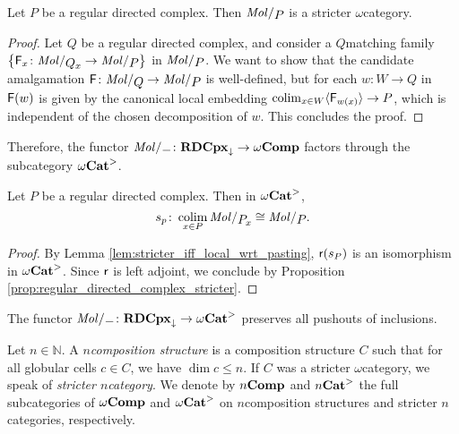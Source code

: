 \begin{prop} \label{prop:regular_directed_complex_stricter}
    Let \( P \) be a regular directed complex.
    Then \( \molecin{P} \) is a stricter \( \omega \)\nbd category.
\end{prop}
\begin{proof}
    Let \( Q \) be a regular directed complex, and consider a \( Q \)\nbd matching family \( \set{\F_x \colon \molecin{\imel{Q}{x}} \to \molecin{P}} \) in \( \molecin{P} \).
    We want to show that the candidate amalgamation \( \F \colon \molecin{Q} \to \molecin{P} \) is well-defined, but for each \( w \colon W \to Q \) in \( \mathsf{F}(w) \) is given by the canonical local embedding \( \operatorname*{colim}_{x \in W} \langle\mathsf{F}_{w(x)}\rangle \to P \), which is independent of the chosen decomposition of \( w \).
    This concludes the proof.
\end{proof}

\noindent Therefore, the functor \( \molecin{-} \colon \rdcpxmap \to \Comp \) factors through the subcategory \( {\omega\mathbf{Cat}}^> \).

\begin{cor} \label{cor:regular_directed_complex_colimit_of_itself}
    Let \( P \) be a regular directed complex.
    Then in \( {\omega\mathbf{Cat}}^> \),
    \begin{equation*}
        s_p \colon \colim_{x \in P} \molecin{\imel{P}{x}} \cong \molecin{P}.
    \end{equation*}
\end{cor}
\begin{proof}
    By Lemma \ref{lem:stricter_iff_local_wrt_pasting}, \( \mathsf{r}(s_P) \) is an isomorphism in \( {\omega\mathbf{Cat}}^> \).
    Since \( \mathsf{r} \) is left adjoint, we conclude by Proposition \ref{prop:regular_directed_complex_stricter}.
\end{proof}

\begin{cor} \label{cor:molecin_preserves_pushout_inclusions}
    The functor \( \molecin{-} \colon \rdcpxmap \to \somegaCat \) preserves all pushouts of inclusions. 
\end{cor}

\begin{dfn} 
    Let \( n \in \mathbb{N} \).
    A \emph{\( n \)\nbd composition structure} is a composition structure \( C \) such that for all globular cells \( c \in C \), we have \( \dim c \le n \).
    If \( C \) was a stricter \( \omega \)\nbd category, we speak of \emph{stricter \( n \)\nbd category}.
    We denote by \( {n\mathbf{Comp}} \) and \( {n\mathbf{Cat}}^> \) the full subcategories of \( \omega\mathbf{Comp} \) and \( {\omega\mathbf{Cat}}^> \) on \( n \)\nbd composition structures and stricter \( n \)\nbd categories, respectively. 
\end{dfn}

